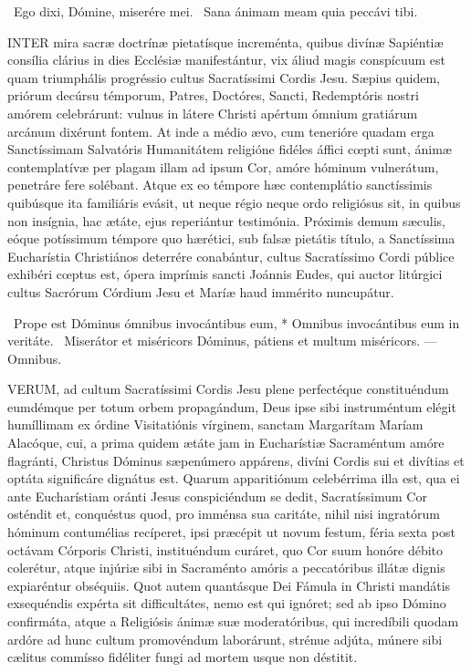 \V\ Ego dixi, Dómine, miserére mei. \R\ Sana ánimam meam quia peccávi tibi.


\lettrine[lines=2]{I}{NTER} mira sacræ doctrínæ pietatísque increménta, quibus divínæ Sapiéntiæ consília clárius in dies Ecclésiæ manifestántur, vix áliud magis conspícuum est quam triumphális progréssio cultus Sacratíssimi Cordis Jesu. Sæpius quidem, priórum decúrsu témporum, Patres, Doctóres, Sancti, Redemptóris nostri amórem celebrárunt: vulnus in látere Christi apértum ómnium gratiárum arcánum dixérunt fontem. At inde a médio ævo, cum tenerióre quadam erga Sanctíssimam Salvatóris Humanitátem religióne fidéles áffici cœpti sunt, ánimæ contemplatívæ per plagam illam ad ipsum Cor, amóre hóminum vulnerátum, penetráre fere solébant. Atque ex eo témpore hæc contemplátio sanctíssimis quibúsque ita familiáris evásit, ut neque régio neque ordo religiósus sit, in quibus non insígnia, hac ætáte, ejus reperiántur testimónia. Próximis demum sæculis, eóque potíssimum témpore quo hærétici, sub falsæ pietátis título, a Sanctíssima Eucharístia Christiános deterrére conabántur, cultus Sacratíssimo Cordi públice exhibéri cœptus est, ópera imprímis sancti Joánnis Eudes, qui auctor litúrgici cultus Sacrórum Córdium Jesu et Maríæ haud immérito nuncupátur.

\R\ Prope est Dóminus ómnibus invocántibus eum, * Omnibus invocántibus eum in veritáte. \V\ Miserátor et miséricors Dóminus, pátiens et multum miséricors. --- Omnibus.


\lettrine[lines=2]{V}{ERUM}, ad cultum Sacratíssimi Cordis Jesu plene perfectéque constituéndum eumdémque per totum orbem propagándum, Deus ipse sibi instruméntum elégit humíllimam ex órdine Visitatiónis vírginem, sanctam Margarítam Maríam Alacóque, cui, a prima quidem ætáte jam in Eucharístiæ Sacraméntum amóre flagránti, Christus Dóminus sæpenúmero appárens, divíni Cordis sui et divítias et optáta significáre dignátus est. Quarum apparitiónum celebérrima illa est, qua ei ante Eucharístiam oránti Jesus conspiciéndum se dedit, Sacratíssimum Cor osténdit et, conquéstus quod, pro imménsa sua caritáte, nihil nisi ingratórum hóminum contumélias recíperet, ipsi præcépit ut novum festum, féria sexta post octávam Córporis Christi, instituéndum curáret, quo Cor suum honóre débito colerétur, atque injúriæ sibi in Sacraménto amóris a peccatóribus illátæ dignis expiaréntur obséquiis. Quot autem quantásque Dei Fámula in Christi mandátis exsequéndis expérta sit difficultátes, nemo est qui ignóret; sed ab ipso Dómino confirmáta, atque a Religiósis ánimæ suæ moderatóribus, qui incredíbili quodam ardóre ad hunc cultum promovéndum laborárunt, strénue adjúta, múnere sibi cælitus commísso fidéliter fungi ad mortem usque non déstitit.

